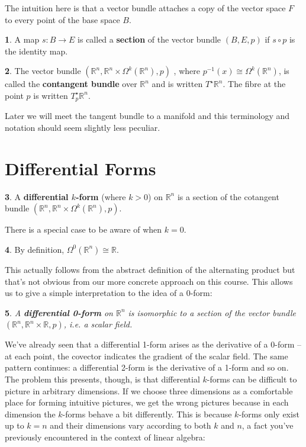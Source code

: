 \documentclass[oneside,english]{amsbook}
\numberwithin{section}{chapter}
\theoremstyle{plain}
\newtheorem{thm}{\protect\theoremname}
\theoremstyle{definition}
\newtheorem{defn}[thm]{\protect\definitionname}
\providecommand{\definitionname}{Definition}
\providecommand{\theoremname}{Theorem}
\begin{document}
			The intuition here is that a vector bundle attaches a copy of the vector space $F$ to every point of the base space $B$.
			
			\begin{defn}
				A map $s:B\to E$ is called a \textbf{section} of the vector bundle $(B, E, p)$ if $s\circ p$ is the identity map.
			\end{defn}
			
			\begin{defn}
				The vector bundle $(\mathbb{R}^n, \mathbb{R}^n\times \Omega^k(\mathbb{R}^n), p)$ , where $p^{-1}(x)\cong \Omega^k(\mathbb{R}^n)$, is called the \textbf{contangent bundle} over $\mathbb{R}^n$ and is written $T^\star\mathbb{R}^n$. The fibre at the point $p$ is written $T_p^\star\mathbb{R}^n$.
			\end{defn}
			
			Later we will meet the tangent bundle to a manifold and this terminology and notation should seem slightly less peculiar.
			
		\section{Differential Forms}
		
			\begin{defn}
				A \textbf{differential $k$-form} (where $k > 0$) on $\mathbb{R}^n$ is a section of the cotangent bundle $(\mathbb{R}^n, \mathbb{R}^n\times \Omega^k(\mathbb{R}^n), p)$.
			\end{defn}
			
			There is a special case to be aware of when $k = 0$.
	 		\begin{defn}
				By definition, $\Omega^0(\mathbb{R}^n)\cong \mathbb{R}$.
			\end{defn}
			This actually follows from the abstract definition of the alternating product but that's not obvious from our more concrete approach on this course. This allows us to give a simple interpretation to the idea of a $0$-form:

			\begin{thm}
				A \textbf{differential 0-form} on $\mathbb{R}^n$ is isomorphic to a section of the vector bundle $(\mathbb{R}^n, \mathbb{R}^n\times \mathbb{R}, p)$, i.e. a scalar field.
			\end{thm}
			
			We've already seen that a differential 1-form arises as the derivative of a 0-form -- at each point, the covector indicates the gradient of the scalar field. The same pattern continues: a differential 2-form is the derivative of a 1-form and so on. The problem this presents, though, is that differential $k$-forms can be difficult to picture in arbitrary dimensions. If we choose three dimensions as a comfortable place for forming intuitive pictures, we get the wrong pictures because in each dimension the $k$-forms behave a bit differently. This is because $k$-forms only exist up to $k=n$ and their dimensions vary according to both $k$ and $n$, a fact you've previously encountered in the context of linear algebra:
			
\end{document}
